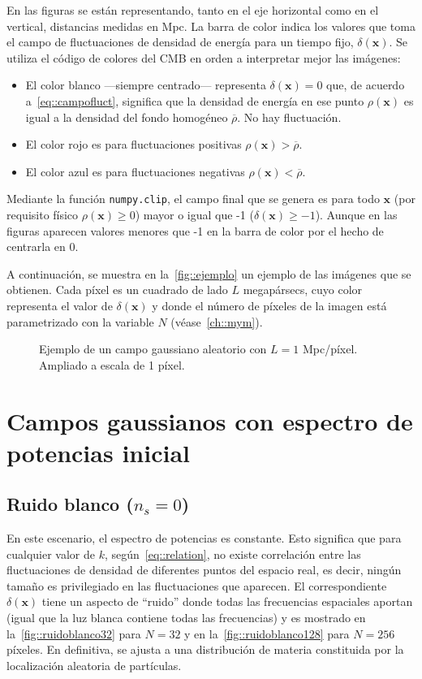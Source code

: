 En las figuras se están representando, tanto en el eje horizontal como en el vertical, distancias medidas en Mpc. La barra de color indica los valores que toma el campo de fluctuaciones de densidad de energía para un tiempo fijo, \(\delta(\symbf{x})\). Se utiliza el código de colores del CMB en orden a interpretar mejor las imágenes:
\begin{itemize}
    \item El color blanco ---siempre centrado--- representa \(\delta(\symbf{x})=0\) que, de acuerdo a~\eqref{eq::campofluct}, significa que la densidad de energía en ese punto \(\rho(\symbf{x})\) es igual a la densidad del fondo homogéneo \(\overbar{\rho}\). No hay fluctuación.
    \item El color rojo es para fluctuaciones positivas \(\rho(\symbf{x})>\overbar{\rho}\).
    \item El color azul es para fluctuaciones negativas \(\rho(\symbf{x})<\overbar{\rho}\).
\end{itemize}
Mediante la función \texttt{numpy.clip}, el campo final que se genera es para todo \(\symbf{x}\) (por requisito físico \(\rho(\symbf{x})\geq 0\)) mayor o igual que -1 (\(\delta(\symbf{x})\geq -1\)). Aunque en las figuras aparecen valores menores que -1 en la barra de color por el hecho de centrarla en 0.

A continuación, se muestra en la~\autoref{fig::ejemplo} un ejemplo de las imágenes que se obtienen. Cada píxel es un cuadrado de lado \(L\) megapársecs, cuyo color representa el valor de \(\delta(\symbf{x})\) y donde el número de píxeles de la imagen está parametrizado con la variable \(N\) (véase~\autoref{ch::mym}).
\begin{figure}[h!]
    \centering
    {}
    \caption[Ejemplo de un campo gaussiano aleatorio con \(L=1\) Mpc/píxel]{Ejemplo de un campo gaussiano aleatorio con \(L=1\) Mpc/píxel. Ampliado a escala de 1 píxel.}
    \label{fig::ejemplo}
\end{figure}
\section{Campos gaussianos con espectro de potencias inicial}
\subsection{Ruido blanco (\texorpdfstring{\(n_s=0\)}{ns=0})}
En este escenario, el espectro de potencias es constante. Esto significa que para cualquier valor de \(k\), según~\eqref{eq::relation}, no existe correlación entre las fluctuaciones de densidad de diferentes puntos del espacio real, es decir, ningún tamaño es privilegiado en las fluctuaciones que aparecen. El correspondiente \(\delta(\symbf{x})\) tiene un aspecto de ``ruido'' donde todas las frecuencias espaciales aportan (igual que la luz blanca contiene todas las frecuencias) y es mostrado en la~\autoref{fig::ruidoblanco32} para \(N=32\) y en la~\autoref{fig::ruidoblanco128} para \(N=256\) píxeles. En definitiva, se ajusta a una distribución de materia constituida por la localización aleatoria de partículas.

